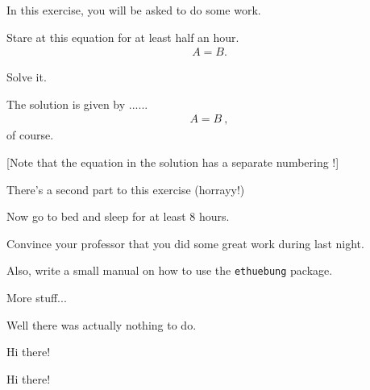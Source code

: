 \documentclass[11pt,a4paper]{article}
\begin{document}
\MakeUebungHeader




In this exercise, you will be asked to do some work.


\begin{exenumerate}
\item Stare at this equation for at least half an hour.
  \begin{align}
    A = B.
  \end{align}

\item Solve it.

  \begin{loesung}
    The solution is given by ...... 
    \begin{align}
      A=B\ ,
    \end{align}
    of course.

    [Note that the equation in the solution has a separate numbering !]
  \end{loesung}
\end{exenumerate}

There's a second part to this exercise (horrayy!)

\begin{exenumerate} %
\item Now go to bed and sleep for at least 8 hours.
\item Convince your professor that you did some great work during last night.
\end{exenumerate}

Also, write a small manual on how to use the \texttt{ethuebung} package.




More stuff...

\begin{solution}
  Well there was actually nothing to do.
\end{solution}


Hi there!


Hi there!
\end{document}
